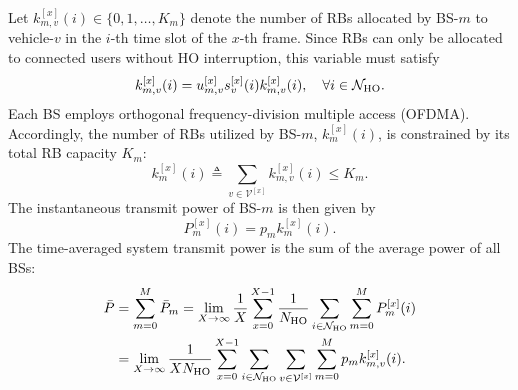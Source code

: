 \documentclass[10pt,journal,letterpaper]{IEEEtran}
\newcommand{\rev}[1]{\textcolor{revisioncolor}{{}#1}}
\theoremstyle{remark}
\begin{document}
Let $k_{m,v}^{[x]}(i) \in \{0,1,\dots,K_m\}$ denote the number of RBs allocated by BS-$m$ to vehicle-$v$ in the $i$-th time slot of the $x$-th frame. Since RBs can only be allocated to connected users\rev{ without HO interruption}, this variable must satisfy
\begin{equation}
    k_{m,v}^{[x]}(i) = u_{m,v}^{[x]}\rev{s_v^{[x]}(i)}k_{m,v}^{[x]}(i), \quad \forall i \in \mathcal{N}_{\rm HO}.
    \label{eq:resource allocation cons}
\end{equation}
Each BS employs orthogonal frequency-division multiple access (OFDMA). Accordingly, the number of RBs utilized by BS-$m$, $k_{m}^{[x]}(i)$, is constrained by its total RB capacity $K_m$:
\begin{equation}
    k_{m}^{[x]}(i) \triangleq \sum_{v\in\mathcal{V}^{[x]}} k_{m,v}^{[x]}(i) \leq K_m.
    \label{eq:RB cons}
\end{equation}
The instantaneous transmit power of BS-$m$ is then given by
\begin{equation}
    P_m^{[x]}(i) = p_m k_{m}^{[x]}(i).
    \label{eq:BS instant power cons}
\end{equation}
The time-averaged system transmit power is the sum of the average power of all BSs:
\begin{align}
    \bar{P} & = \sum_{m=0}^M \bar{P}_m =\lim_{X\to\infty}\frac{1}{X} \sum_{x=0}^{X-1}\rev{\frac{1}{N_{\rm HO}}}\sum_{i \in \mathcal{N}_{\rm HO}} \sum_{m=0}^MP_m^{[x]}(i) \nonumber \\
    &=\lim_{X\to\infty}\frac{1}{XN_{\rm HO}}\sum_{x=0}^{X-1}\sum_{i \in \mathcal{N}_{\rm HO}}  \sum_{v\in\mathcal{V}^{[x]}} \sum_{m=0}^M p_m  k_{m,v}^{[x]}(i).
    \label{eq:area timeavg power cons}
\end{align}
\end{document}
